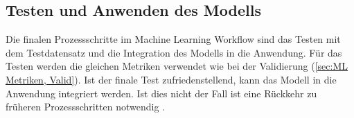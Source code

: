 \subsection{Testen und Anwenden des Modells}
Die finalen Prozessschritte im \gls{Machine Learning Workflow} sind das Testen mit dem \gls{Testdatensatz} und die Integration des Modells in die Anwendung. Für das Testen werden die gleichen Metriken verwendet wie bei der Validierung (\ref{sec:ML Metriken, Valid}). Ist der finale Test zufriedenstellend, kann das Modell in die Anwendung integriert werden. Ist dies nicht der Fall ist eine Rückkehr zu früheren Prozessschritten notwendig \cite{Zheng.2015, Burkov.2019}.